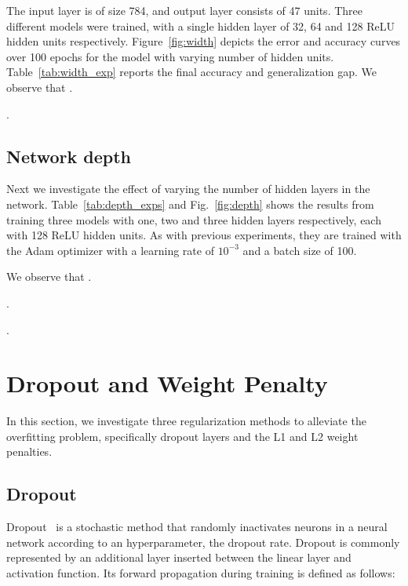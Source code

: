 \documentclass{article}
\begin{document}
The input layer is of size 784, and output layer consists
of 47 units.
Three different models were trained, with a
single hidden layer of 32, 64 and 128 ReLU hidden units
respectively.
Figure~\ref{fig:width} depicts the error and accuracy curves over 100 epochs for the model with varying number of hidden units.
Table~\ref{tab:width_exp} reports the final accuracy and generalization gap.
We observe that \questionEight.

\questionNine.


\subsection{Network depth}

\questionTableTwo
\questionFigureThree

Next we investigate the effect of varying the number of hidden
layers in the network.
Table~\ref{tab:depth_exps} and Fig.~\ref{fig:depth} shows the results from
training three models with one, two and three hidden layers respectively,
each with 128 ReLU hidden units.
As with previous experiments, they are
trained with the Adam optimizer with a learning rate of  $10^{-3}$ and
a batch size of 100.

We observe that \questionTen.

\questionEleven.

\questionTwelve.





\section{Dropout and Weight Penalty}
\label{sec:task2.1}

In this section, we investigate three regularization methods to
alleviate the overfitting problem, specifically dropout layers
and the L1 and L2 weight penalties.

\subsection{Dropout}

Dropout~\cite{srivastava2014dropout}
is a stochastic method that randomly inactivates
neurons in a neural network according to an hyperparameter, the
dropout rate. Dropout is commonly represented by an
additional layer inserted between the linear layer and
activation function.
Its forward propagation during training is defined as follows:
\end{document}
